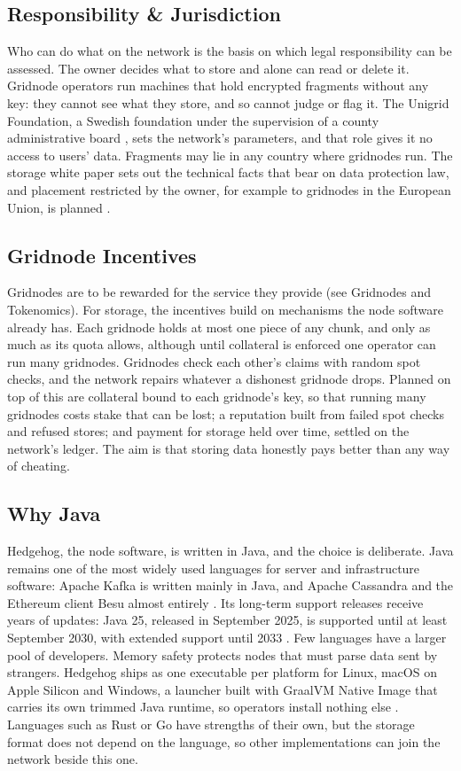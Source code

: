 \documentclass[a4paper,oneside]{article}
\begin{document}
\subsection{Responsibility \& Jurisdiction}
Who can do what on the network is the basis on which legal responsibility can be assessed. The owner decides what to store and alone can read or delete it. Gridnode operators run machines that hold encrypted fragments without any key: they cannot see what they store, and so cannot judge or flag it. The Unigrid Foundation, a Swedish foundation under the supervision of a county administrative board \cite{stiftelselag}, sets the network's parameters, and that role gives it no access to users' data. Fragments may lie in any country where gridnodes run. The storage white paper sets out the technical facts that bear on data protection law, and placement restricted by the owner, for example to gridnodes in the European Union, is planned \cite{storage2026}.

\subsection{Gridnode Incentives}
Gridnodes are to be rewarded for the service they provide (see Gridnodes and Tokenomics). For storage, the incentives build on mechanisms the node software already has. Each gridnode holds at most one piece of any chunk, and only as much as its quota allows, although until collateral is enforced one operator can run many gridnodes. Gridnodes check each other's claims with random spot checks, and the network repairs whatever a dishonest gridnode drops. Planned on top of this are collateral bound to each gridnode's key, so that running many gridnodes costs stake that can be lost; a reputation built from failed spot checks and refused stores; and payment for storage held over time, settled on the network's ledger. The aim is that storing data honestly pays better than any way of cheating.

\subsection{Why Java}
Hedgehog, the node software, is written in Java, and the choice is deliberate. Java remains one of the most widely used languages for server and infrastructure software: Apache Kafka is written mainly in Java, and Apache Cassandra and the Ethereum client Besu almost entirely \cite{kafkaRepo,cassandraRepo,besuDocs}. Its long-term support releases receive years of updates: Java 25, released in September 2025, is supported until at least September 2030, with extended support until 2033 \cite{oracleJavaRoadmap}. Few languages have a larger pool of developers. Memory safety protects nodes that must parse data sent by strangers. Hedgehog ships as one executable per platform for Linux, macOS on Apple Silicon and Windows, a launcher built with GraalVM Native Image that carries its own trimmed Java runtime, so operators install nothing else \cite{graalvmNativeImage}. Languages such as Rust or Go have strengths of their own, but the storage format does not depend on the language, so other implementations can join the network beside this one.
\end{document}

